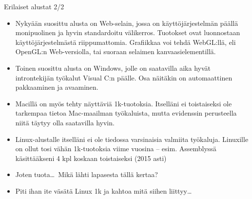\documentclass[pdf,10pt]{beamer}
\begin{document}
\begin{frame}{Erilaiset alustat 2/2}
  \begin{itemize}
    \item Nykyään suosittu alusta on Web-selain, jossa on
      käyttöjärjestelmän päällä monipuolinen ja hyvin standardoitu
      välikerros. Tuotokset ovat luonnostaan käyttöjärjestelmästä
      riippumattomia. Grafiikkaa voi tehdä WebGL:llä, eli OpenGL:n
      Web-versiolla, tai suoraan selaimen kanvaasielementillä.
    \item Toinen suosittu alusta on Windows, jolle on saatavilla aika
      hyvät introntekijän työkalut Visual C:n päälle. Osa näitäkin on
      automaattinen pakkaaminen ja avaaminen.
    \item Macillä on myös tehty näyttäviä 1k-tuotoksia. Itselläni ei
      toistaiseksi ole tarkempaa tietoa Mac-maailman työkaluista,
      mutta evidenssin perusteella niitä täytyy olla saatavilla hyvin.
    \item Linux-alustalle itselläni ei ole tiedossa varsinaisia
      valmiita työkaluja. Linuxille on ollut tosi vähän 1k-tuotoksia
      viime vuosina -- esim. Assemblyssä käsittääkseni 4 kpl koskaan
      toistaiseksi (2015 asti)
    \item Joten tuota\ldots\ Mikä lähti lapasesta tällä kertaa?
    \item Piti ihan ite väsätä Linux 1k ja kahtoa mitä siihen
      liittyy\ldots
  \end{itemize}
\end{frame}
\end{document}
